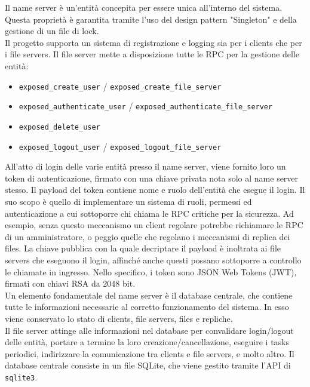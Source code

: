 \documentclass[a4paper, 12pt]{scrreprt}
\begin{document}

            Il name server è un'entità concepita per essere unica all'interno del sistema. Questa proprietà è garantita tramite l'uso del design pattern "Singleton" e della gestione di un file di lock.\\
            Il progetto supporta un sistema di registrazione e logging sia per i clients che per i file servers. Il file server mette a disposizione tutte le RPC per la gestione delle entità:

            \begin{itemize}

                \item \texttt{exposed\_create\_user} / \texttt{exposed\_create\_file\_server}

                \item \texttt{exposed\_authenticate\_user} / \texttt{exposed\_authenticate\_file\_server}

                \item \texttt{exposed\_delete\_user}

                \item \texttt{exposed\_logout\_user} / \texttt{exposed\_logout\_file\_server}

            \end{itemize}

            All'atto di login delle varie entità presso il name server, viene fornito loro un token di autenticazione, firmato con una chiave privata nota solo al name server stesso. Il payload del token contiene nome e ruolo dell'entità che esegue il login. Il suo scopo è quello di implementare un sistema di ruoli, permessi ed autenticazione a cui sottoporre chi chiama le RPC critiche per la sicurezza. Ad esempio, senza questo meccanismo un client regolare potrebbe richiamare le RPC di un amministratore, o peggio quelle che regolano i meccanismi di replica dei files. La chiave pubblica con la quale decriptare il payload è inoltrata ai file servers che eseguono il login, affinché anche questi possano sottoporre a controllo le chiamate in ingresso. Nello specifico, i token sono JSON Web Tokens (JWT), firmati con chiavi RSA da 2048 bit.\\
            Un elemento fondamentale del name server è il database centrale, che contiene tutte le informazioni necessarie al corretto funzionamento del sistema. In esso viene conservato lo stato di clients, file servers, files e repliche.\\
            Il file server attinge alle informazioni nel database per convalidare login/logout delle entità, portare a termine la loro creazione/cancellazione, eseguire i tasks periodici, indirizzare la comunicazione tra clients e file servers, e molto altro. Il database centrale consiste in un file SQLite, che viene gestito tramite l'API di \texttt{sqlite3}.
\end{document}
